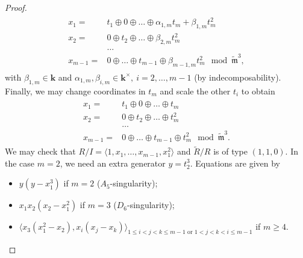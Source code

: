 \documentclass[11pt]{amsart}
\renewcommand{\k}{\mathbf k}
\newcommand{\tR}{\widetilde{R}}
\newcommand{\tm}{\widetilde{\mathfrak m}}
\theoremstyle{plain}
\theoremstyle{definition}
\begin{document}
\begin{proof}
\begin{align}
\begin{split}
  x_1= & t_1\oplus0\oplus\ldots\oplus\alpha_{1,m}t_m+\beta_{1,m}t_m^2\\
  x_2= & 0\oplus t_2\oplus\ldots\oplus\beta_{2,m}t_m^2\\
  &\ldots\\
  x_{m-1}= & 0\oplus\ldots\oplus t_{m-1}\oplus \beta_{m-1,m}t_m^2 \mod\tm^3,
 \end{split}
 \end{align}
 with $\beta_{1,m}\in\k$ and $\alpha_{1,m},\beta_{i,m}\in\k^\times,\ i=2,\ldots,m-1$ (by indecomposability). Finally, we may change coordinates in $t_m$ and scale the other $t_i$ to obtain
 \begin{align}\label{coordII}
 \begin{split}
  x_1= & t_1\oplus0\oplus\ldots\oplus t_m\\
  x_2= & 0\oplus t_2\oplus\ldots\oplus t_m^2\\
  &\ldots\\
  x_{m-1}= & 0\oplus\ldots\oplus t_{m-1}\oplus t_m^2\mod\tm^3.
 \end{split}
 \end{align}
 We may check that $R/I=\langle 1,x_1,\ldots,x_{m-1},x_1^2\rangle$ and $\tR/R$ is of type $(1,1,0)$. In the case $m=2$, we need an extra generator $y=t_2^3$. Equations are given by
 \begin{itemize}
  \item $y(y-x_1^3)$ if $m=2$ ($A_5$-singularity);
  \item $x_1x_2(x_2-x_1^2)$ if $m=3$ ($D_6$-singularity);
  \item $\langle x_3(x_1^2-x_2),x_i(x_j-x_k)\rangle_{1\leq i<j<k\leq m-1 \text{ or }1<j<k<i\leq m-1}$ if $m\geq 4$.
 \end{itemize}


\end{proof}
\end{document}
